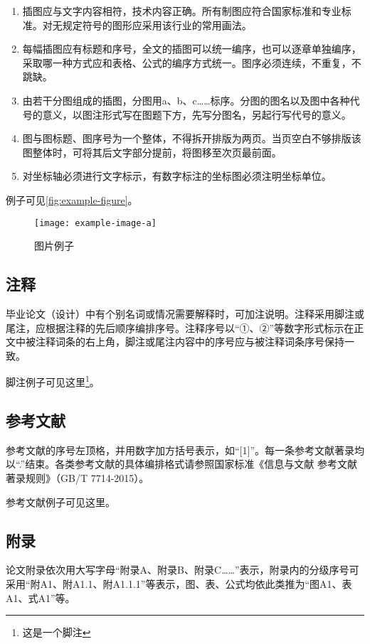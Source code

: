 \begin{enumerate}
    \item 插图应与文字内容相符，技术内容正确。所有制图应符合国家标准和专业标准。对无规定符号的图形应采用该行业的常用画法。
    \item 每幅插图应有标题和序号，全文的插图可以统一编序，也可以逐章单独编序，采取哪一种方式应和表格、公式的编序方式统一。图序必须连续，不重复，不跳缺。
    \item 由若干分图组成的插图，分图用a、b、c……标序。分图的图名以及图中各种代号的意义，以图注形式写在图题下方，先写分图名，另起行写代号的意义。
    \item 图与图标题、图序号为一个整体，不得拆开排版为两页。当页空白不够排版该图整体时，可将其后文字部分提前，将图移至次页最前面。
    \item 对坐标轴必须进行文字标示，有数字标注的坐标图必须注明坐标单位。
\end{enumerate}

例子可见\autoref{fig:example-figure}。

\begin{figure}[!htbp]
    \centering
    \texttt{[image: example-image-a]}
    \caption{图片例子}
    \label{fig:example-figure}
\end{figure}

\subsection{注释}

毕业论文（设计）中有个别名词或情况需要解释时，可加注说明。注释采用脚注或尾注，应根据注释的先后顺序编排序号。注释序号以``①、②''等数字形式标示在正文中被注释词条的右上角，脚注或尾注内容中的序号应与被注释词条序号保持一致。

脚注例子可见这里\footnote{这是一个脚注}。

\subsection{参考文献}

参考文献的序号左顶格，并用数字加方括号表示，如``[1]''。每一条参考文献著录均以``.''结束。各类参考文献的具体编排格式请参照国家标准《信息与文献 参考文献著录规则》（GB/T 7714-2015）。

参考文献例子可见这里\cite{sysu-thesis}。


\subsection{附录}

论文附录依次用大写字母``附录A、附录B、附录C……''表示，附录内的分级序号可采用``附A1、附A1.1、附A1.1.1''等表示，图、表、公式均依此类推为``图A1、表A1、式A1''等。

